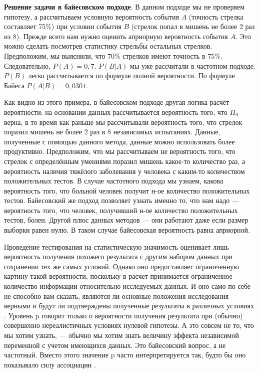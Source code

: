 \textbf{Решение задачи в байесовском подходе}. В данном подходе мы не проверяем гипотезу, а рассчитываем условную вероятность события $A$ (точность стрелка составляет 75\%) при условии события $B$ (стрелок попал в мишень не более 2 раз из 8). Прежде всего нам нужно оценить априорную вероятность события $A$. Это можно сделать посмотрев статистику стрельбы остальных стрелков. Предположим, мы выяснили, что 70\% стрелков имеют точность в 75\%. Следовательно, $P(A)=0,7$. $P(B|A)$ мы уже рассчитали в частотном подходе. $P(B)$ легко рассчитывается по формуле полной вероятности. По формуле Байеса $P(A|B)=0,0301$. 

Как видно из этого примера, в байесовском подходе другая логика расчёт вероятности: на основании данных рассчитывается вероятность того, что $H_{0}$ верна, в то время как раньше мы рассчитывали вероятность того, что стрелок поразил мишень не более 2 раз в 8 независимых испытаниях. Данные, полученные с помощью данного метода, данные можно использовать более продуктивно. Предположим, что мы рассчитываем не вероятность того, что стрелок с определённым умениями поразил мишень какое-то количество раз, а вероятность наличия тяжёлого заболевания у человека с каким-то количеством положительных тестов. В случае частотного подхода мы узнаем, какова вероятность того, что больной человек получит н-ое количество положительных тестов. Байесовский же подход позволяет узнать именно то, что нам надо --- вероятность того, что человек, получивший н-ое количество положительных тестов, болен. Другой плюс данных методов --- они работают даже если размер выборки равен нулю. В таком случае байесовская вероятность равна априорной.

Проведение тестирования на статистическую значимость оценивает лишь вероятность получения похожего результата с другим набором данных при сохранении тех же самых условий. Однако оно предоставляет ограниченную картину такой вероятности, поскольку в расчет принимается ограниченное количество информации относительно исследуемых данных. И оно само по себе не способно вам сказать, являются ли основные положения исследования верными и будут ли подтверждены полученные результаты в различных условиях \cite{bastian2013}. Уровень p говорит только о вероятности получения результата при (обычно) совершенно нереалистичных условиях нулевой гипотезы. А это совсем не то, что мы хотим узнать, --- обычно мы хотим знать величину эффекта независимой переменной с учетом имеющихся данных. Это байесовский вопрос, а не частотный. Вместо этого значение p часто интерпретируется так, будто бы оно показывало силу ассоциации \cite[стр. 11]{Schrodt2010}.

